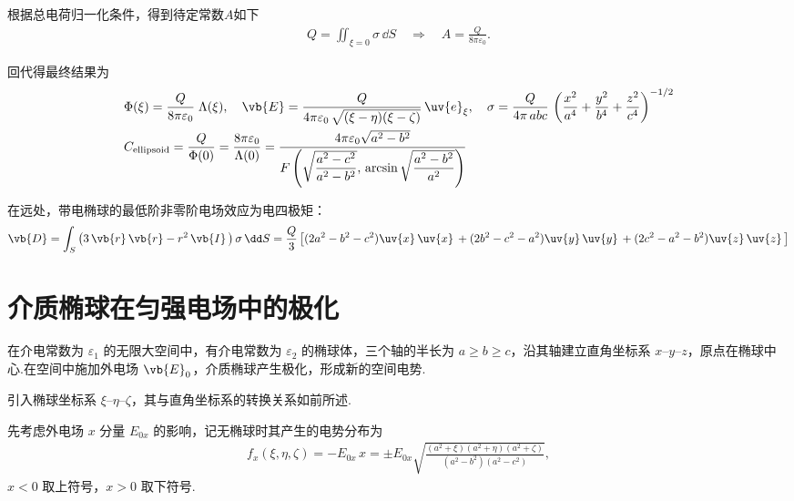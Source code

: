根据总电荷归一化条件，得到待定常数\(A\)如下
\begin{align*}
	Q=\iint_{\xi=0}\sigma\,\dd S
	\quad\Longrightarrow\quad
	A=\frac{Q}{8\pi\varepsilon_{0}}.
\end{align*}

回代得最终结果为
\begin{align*}
	&\Phi(\xi)
	=\frac{Q}{8\pi\varepsilon_{0}}\;\Lambda(\xi),\quad
	\vb{E}
	=\frac{Q}{4\pi\varepsilon_{0}\,\sqrt{(\xi-\eta)(\xi-\zeta)}}\,
	\uv{e}_{\xi},\quad
	\sigma
	=\frac{Q}{4\pi\,a b c}\,
	\left( \frac{x^2}{a^4} + \frac{y^2}{b^4} + \frac{z^2}{c^4} \right)^{-1/2}\\
	&C_{\mathrm{ellipsoid}}
	=\frac{Q}{\Phi(0)}
	=\frac{8\pi\varepsilon_{0}}{\Lambda(0)}=\frac{4\pi\varepsilon_{0} \sqrt{a^2 - b^2} }{F\left( \sqrt{ \dfrac{a^2 - c^2}{a^2 - b^2} },\,
		\arcsin \sqrt{ \dfrac{a^2 - b^2}{a^2} } \right)}
\end{align*}

在远处，带电椭球的最低阶非零阶电场效应为电四极矩：
\begin{align*}
	\vb{D} = \int_S \left(3\,\vb{r}\,\vb{r} - r^2\, \vb{I}\,\right) \sigma \, \dd S
	= \frac{Q}{3} \left[
		(2a^2 - b^2 - c^2) \uv{x}\,\uv{x}\, +
		(2b^2 - c^2 - a^2) \uv{y}\,\uv{y}\, +
		(2c^2 - a^2 - b^2) \uv{z}\,\uv{z}\,
		\right]
\end{align*}
\section{介质椭球在匀强电场中的极化}

在介电常数为 \(\varepsilon_1\) 的无限大空间中，有介电常数为 \(\varepsilon_2\) 的椭球体，三个轴的半长为 \(a\ge b\ge c\)，沿其轴建立直角坐标系 \(x\)–\(y\)–\(z\)，原点在椭球中心.在空间中施加外电场 \(\vb{E}_0\)，介质椭球产生极化，形成新的空间电势.

引入椭球坐标系 \(\xi\)–\(\eta\)–\(\zeta\)，其与直角坐标系的转换关系如前所述.

先考虑外电场 \(x\) 分量 \(E_{0x}\) 的影响，记无椭球时其产生的电势分布为
\begin{align*}
	f_x(\xi,\eta,\zeta)=-E_{0x}\,x
	=\pm E_{0x}\sqrt{\frac{(a^2+\xi)(a^2+\eta)(a^2+\zeta)}{(a^2-b^2)(a^2-c^2)}},
\end{align*}
\(x<0\) 取上符号，\(x>0\) 取下符号.

